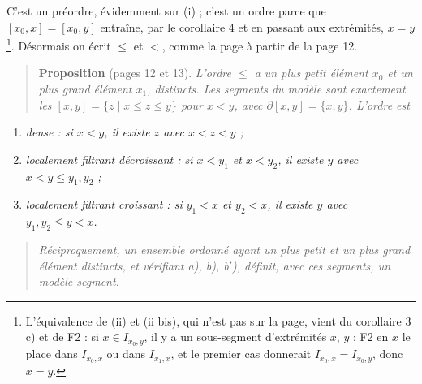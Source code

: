 \documentclass[11pt,a4paper]{article}
\begin{document}
C'est un préordre, évidemment sur (i) ; c'est un ordre parce que $[x_{0},x] =
[x_{0},y]$ entraîne, par le corollaire 4 et en passant aux extrémités, $x =
y$\footnote{L'équivalence de (ii) et (ii bis), qui n'est pas sur la page, vient
du corollaire 3 c) et de F2 : si $x \in I_{x_{0},y}$, il y a un sous-segment
d'extrémités $x$, $y$ ; F2 en $x$ le place dans $I_{x_{0},x}$ ou dans
$I_{x_{1},x}$, et le premier cas donnerait $I_{x_{0},x} = I_{x_{0},y}$, donc $x
= y$.}. Désormais on écrit $\leq$ et $<$, comme la page à partir de la page 12.

\begin{quote}
\textbf{Proposition} (pages 12 et 13). \emph{L'ordre $\leq$ a un plus petit
élément $x_{0}$ et un plus grand élément $x_{1}$, distincts. Les segments du
modèle sont exactement les $[x,y] = \{z \mid x \leq z \leq y\}$ pour $x < y$,
avec $\partial [x,y] = \{x,y\}$. L'ordre est}
\end{quote}

\begin{enumerate}
\item[a)] \emph{dense : si $x < y$, il existe $z$ avec $x < z < y$ ;}
\item[b)] \emph{localement filtrant décroissant : si $x < y_{1}$ et $x <
y_{2}$, il existe $y$ avec $x < y \leq y_{1}, y_{2}$ ;}
\item[b$'$)] \emph{localement filtrant croissant : si $y_{1} < x$ et $y_{2} <
x$, il existe $y$ avec $y_{1}, y_{2} \leq y < x$.}
\end{enumerate}

\begin{quote}
\emph{Réciproquement, un ensemble ordonné ayant un plus petit et un plus grand
élément distincts, et vérifiant a), b), b$'$), définit, avec ces segments, un
modèle-segment.}
\end{quote}
\end{document}
